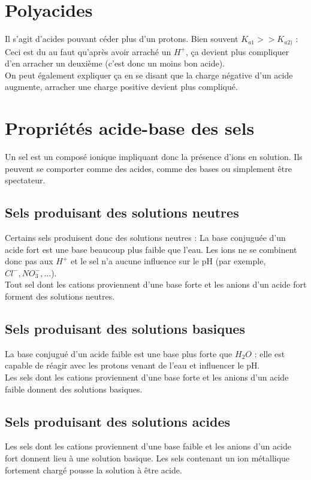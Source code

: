 \documentclass	[11pt, a4paper, openany]{book}
\begin{document}
\section{Polyacides}
Il s'agit d'acides pouvant céder plus d'un protons. Bien souvent $K_{a1} >> K_{a2)}$ : Ceci est du au faut qu'après avoir arraché un $H^+$, ça devient plus compliquer d'en arracher un deuxième (c'est donc un moins bon acide).\\
On peut également expliquer ça en se disant que la charge négative d'un acide augmente, arracher une charge positive devient plus compliqué.

\section{Propriétés acide-base des sels}
Un sel est un composé ionique impliquant donc la présence d'ions en solution. Ils peuvent se comporter comme des acides, comme des bases ou simplement être spectateur. \\

\subsection{Sels produisant des solutions neutres}
Certains sels produisent donc des solutions neutres : La base conjuguée d'un acide fort est une base beaucoup plus faible que l'eau. Les ions ne se combinent donc pas aux $H^+$ et le sel n'a aucune influence sur le pH (par exemple, $Cl^-, NO_3^-, ...$).\\
Tout sel dont les cations proviennent d'une base forte et les anions d'un acide fort forment des solutions neutres.

\subsection{Sels produisant des solutions basiques}
La base conjugué d'un acide faible est une base plus forte que $H_2O$ : elle est capable de réagir avec les protons venant de l'eau et influencer le pH.\\
Les sels dont les cations proviennent d'une base forte et les anions d'un acide faible donnent des solutions basiques.

\subsection{Sels produisant des solutions acides}
Les sels dont les cations proviennent d'une base faible et les anions d'un acide fort donnent lieu à une solution basique. Les sels contenant un ion métallique fortement chargé pousse la solution à être acide. 
\end{document}
